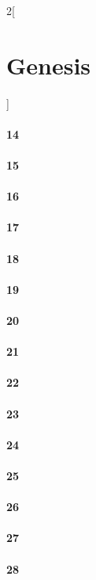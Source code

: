 \documentclass{book}
\begin{document}
\begin{multicols}{2}[\part{Genesis}]
\subsection*{14}
\subsection*{15}
\subsection*{16}
\subsection*{17}
\subsection*{18}
\subsection*{19}
\subsection*{20}
\subsection*{21}
\subsection*{22}
\subsection*{23}
\subsection*{24}
\subsection*{25}
\subsection*{26}
\subsection*{27}
\subsection*{28}

\end{multicols}
\end{document}

